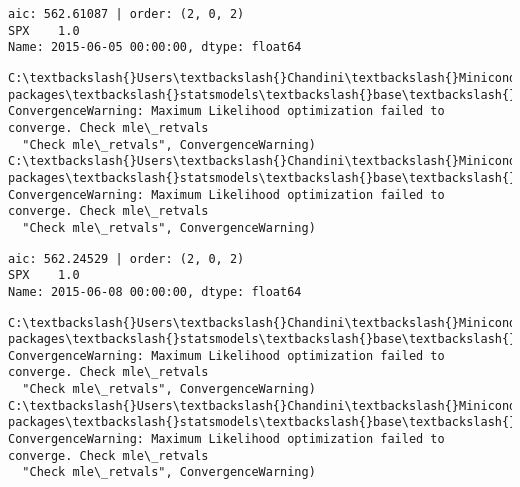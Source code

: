 \documentclass[11pt]{article}
\begin{document}
    \begin{Verbatim}[commandchars=\\\{\}]
aic: 562.61087 | order: (2, 0, 2)
SPX    1.0
Name: 2015-06-05 00:00:00, dtype: float64

    \end{Verbatim}

    \begin{Verbatim}[commandchars=\\\{\}]
C:\textbackslash{}Users\textbackslash{}Chandini\textbackslash{}Miniconda3\textbackslash{}envs\textbackslash{}auquan\textbackslash{}lib\textbackslash{}site-packages\textbackslash{}statsmodels\textbackslash{}base\textbackslash{}model.py:496: ConvergenceWarning: Maximum Likelihood optimization failed to converge. Check mle\_retvals
  "Check mle\_retvals", ConvergenceWarning)
C:\textbackslash{}Users\textbackslash{}Chandini\textbackslash{}Miniconda3\textbackslash{}envs\textbackslash{}auquan\textbackslash{}lib\textbackslash{}site-packages\textbackslash{}statsmodels\textbackslash{}base\textbackslash{}model.py:496: ConvergenceWarning: Maximum Likelihood optimization failed to converge. Check mle\_retvals
  "Check mle\_retvals", ConvergenceWarning)

    \end{Verbatim}

    \begin{Verbatim}[commandchars=\\\{\}]
aic: 562.24529 | order: (2, 0, 2)
SPX    1.0
Name: 2015-06-08 00:00:00, dtype: float64

    \end{Verbatim}

    \begin{Verbatim}[commandchars=\\\{\}]
C:\textbackslash{}Users\textbackslash{}Chandini\textbackslash{}Miniconda3\textbackslash{}envs\textbackslash{}auquan\textbackslash{}lib\textbackslash{}site-packages\textbackslash{}statsmodels\textbackslash{}base\textbackslash{}model.py:496: ConvergenceWarning: Maximum Likelihood optimization failed to converge. Check mle\_retvals
  "Check mle\_retvals", ConvergenceWarning)
C:\textbackslash{}Users\textbackslash{}Chandini\textbackslash{}Miniconda3\textbackslash{}envs\textbackslash{}auquan\textbackslash{}lib\textbackslash{}site-packages\textbackslash{}statsmodels\textbackslash{}base\textbackslash{}model.py:496: ConvergenceWarning: Maximum Likelihood optimization failed to converge. Check mle\_retvals
  "Check mle\_retvals", ConvergenceWarning)

    \end{Verbatim}
\end{document}
